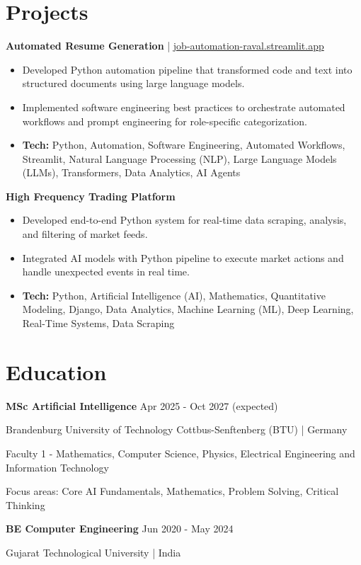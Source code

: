 \documentclass[a4paper,10pt]{article}
\begin{document}
\section*{Projects}
\textbf{Automated Resume Generation} | \href{https://job-automation-raval.streamlit.app/}{job-automation-raval.streamlit.app}\par
\begin{itemize}
\item Developed Python automation pipeline that transformed code and text into structured documents using large language models.
\item Implemented software engineering best practices to orchestrate automated workflows and prompt engineering for role-specific categorization.
\item \textbf{Tech:} Python, Automation, Software Engineering, Automated Workflows, Streamlit, Natural Language Processing (NLP), Large Language Models (LLMs), Transformers, Data Analytics, AI Agents
\end{itemize}
\vspace{3pt}
\textbf{High Frequency Trading Platform}\par
\begin{itemize}
\item Developed end-to-end Python system for real-time data scraping, analysis, and filtering of market feeds.
\item Integrated AI models with Python pipeline to execute market actions and handle unexpected events in real time.
\item \textbf{Tech:} Python, Artificial Intelligence (AI), Mathematics, Quantitative Modeling, Django, Data Analytics, Machine Learning (ML), Deep Learning, Real-Time Systems, Data Scraping
\end{itemize}
\vspace{3pt}

\section*{Education}
\textbf{MSc Artificial Intelligence} \hfill Apr 2025 - Oct 2027 (expected)\par
Brandenburg University of Technology Cottbus-Senftenberg (BTU) | Germany\par
Faculty 1 - Mathematics, Computer Science, Physics, Electrical Engineering and Information Technology\par
Focus areas: Core AI Fundamentals, Mathematics, Problem Solving, Critical Thinking\par
\vspace{3pt}
\textbf{BE Computer Engineering} \hfill Jun 2020 - May 2024\par
Gujarat Technological University | India\par
\vspace{3pt}
\end{document}
